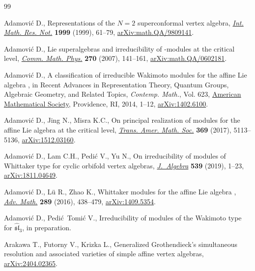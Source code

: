 \documentclass[10pt,a4paper]{amsart}
\numberwithin{equation}{section}
\theoremstyle{definition}
\newcommand{\1}{\textbf{1}}
\begin{document}
\begin{thebibliography}{99}
\footnotesize\itemsep=0pt

Adamovi\'c D., Representations of the {$N=2$} superconformal vertex algebra,
 \href{https://doi.org/10.1155/S1073792899000033}{\textit{Int. Math. Res.
 Not.}} \textbf{1999} (1999), 61--79,
 \href{http://arxiv.org/abs/math.QA/9809141}{arXiv:math.QA/9809141}.

Adamovi\'c D., Lie superalgebras and irreducibility of
 -modules at the critical level,
 \href{https://doi.org/10.1007/s00220-006-0153-7}{\textit{Comm. Math. Phys.}}
 \textbf{270} (2007), 141--161,
 \href{http://arxiv.org/abs/math.QA/0602181}{arXiv:math.QA/0602181}.

Adamovi\'c D., A classification of irreducible {W}akimoto modules for the
 affine {L}ie algebra , in Recent Advances in
 Representation Theory, Quantum Groups, Algebraic Geometry, and Related
 Topics, \textit{Contemp. Math.}, Vol. 623,
 \href{https://doi.org/10.1090/conm/623/12454}{American Mathematical Society},
 Providence, RI, 2014, 1--12,
 \href{http://arxiv.org/abs/1402.6100}{arXiv:1402.6100}.

Adamovi\'c D., Jing N., Misra K.C., On principal realization of modules for the
 affine {L}ie algebra  at the critical level,
 \href{https://doi.org/10.1090/tran/7009}{\textit{Trans. Amer. Math. Soc.}}
 \textbf{369} (2017), 5113--5136,
 \href{http://arxiv.org/abs/1512.03160}{arXiv:1512.03160}.

Adamovi\'c D., Lam C.H., Pedi\'c V., Yu N., On irreducibility of modules of
 {W}hittaker type for cyclic orbifold vertex algebras,
 \href{https://doi.org/10.1016/j.jalgebra.2019.08.007}{\textit{J.~Algebra}}
 \textbf{539} (2019), 1--23,
 \href{http://arxiv.org/abs/1811.04649}{arXiv:1811.04649}.

Adamovi\'c D., L\"{u} R., Zhao K., Whittaker modules for the affine {L}ie
 algebra ,
 \href{https://doi.org/10.1016/j.aim.2015.11.020}{\textit{Adv. Math.}}
 \textbf{289} (2016), 438--479,
 \href{http://arxiv.org/abs/1409.5354}{arXiv:1409.5354}.

Adamovi\'c D., Pedi\'c~Tomi\'c V., Irreducibility of modules of the Wakimoto type for $\widehat{\mathfrak{sl}}_3$, {i}n preparation.

Arakawa T., Futorny V., Krizka L., Generalized {G}rothendieck's simultaneous
 resolution and associated varieties of simple affine vertex algebras,
 \href{http://arxiv.org/abs/2404.02365}{arXiv:2404.02365}.


\end{thebibliography}
\end{document}
